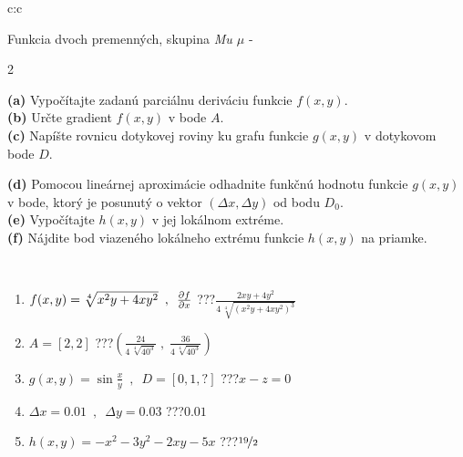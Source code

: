 \documentclass[10pt]{report}
\begin{document}
\begin{tabular}{c:c}
\\ \hdashline
\begin{minipage}[c][104.5mm][t]{0.5\linewidth}
\begin{center}
\vspace{7mm}
{\huge \LARGE Funkcia dvoch premenných, skupina \textit{Mu $\mu$} -}\\[5mm]
\begin{minipage}{0.95\linewidth}
\begin{center}
{\small \begin{multicols}{2} \raggedright
\textbf{(a)} Vypočítajte zadanú parciálnu deriváciu funkcie \(f(x,y)\). \\[1mm]
\textbf{(b)} Určte gradient \(f(x,y)\) v bode \(A\). \\[1mm]
\textbf{(c)} Napíšte rovnicu dotykovej roviny ku grafu funkcie \(g(x,y)\) v dotykovom bode \(D\). \par \columnbreak
\textbf{(d)} Pomocou lineárnej aproximácie odhadnite funkčnú hodnotu funkcie \(g(x,y)\) v bode, ktorý je posunutý o vektor \((\Delta x, \Delta y)\) od bodu \(D_0\). \\[1mm]
\textbf{(e)} Vypočítajte \(h(x,y)\) v jej lokálnom extréme. \\[1mm]
\textbf{(f)} Nájdite bod viazeného lokálneho extrému funkcie \(h(x,y)\) na priamke. \\[1mm]
\end{multicols}
}
\end{center}
\end{minipage}
\\[4mm]
\begin{minipage}{0.79\linewidth}
\begin{center}
\begin{varwidth}{\linewidth}
\begin{enumerate}
\normalsizerr
\item $f(x,y) = \sqrt[4]{x^2y + 4xy^2}\enspace , \enspace \pdv{f}{x}$\quad \dotfill\; ???\;\dotfill \quad $\frac{2xy+4y^2}{4\,\sqrt[4]{(x^2y+4xy^2)^{3}}}$
\item $A = [2, 2]$\quad \dotfill\; ???\;\dotfill \quad $\left( \frac{24}{4\,\sqrt[4]{40^3}} \;,\; \frac{36}{4\,\sqrt[4]{40^3}} \right)$
\item $g(x,y) = \sin\frac{x}{y} \enspace , \enspace D = [0, 1, ?]$\quad \dotfill\; ???\;\dotfill \quad $x-z=0$
\item $\Delta x = {0.01} \enspace,\enspace \Delta y = {0.03}$\quad \dotfill\; ???\;\dotfill \quad $0.01$
\item $h(x,y) = -x^2-3y^2-2xy-5x$\quad \dotfill\; ???\;\dotfill \quad $\nicefrac{19}{2}$

\end{enumerate}
\end{varwidth}
\end{center}
\end{minipage}
\end{center}
\end{minipage}
\end{tabular}
\end{document}
